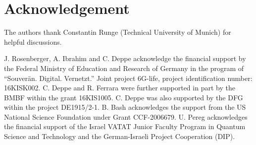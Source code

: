\documentclass[conference,final]{IEEEtran}
\begin{document}
\ifblind\else
\section*{Acknowledgement}

The authors thank Constantin Runge (Technical University of Munich)
for helpful discussions.








J. Rosenberger, A. Ibrahim and C. Deppe
acknowledge the financial support by the Federal Ministry of
Education and Research of Germany in the program of “Souverän. Digital.
Vernetzt.” Joint project 6G-life, project identification number: 16KISK002. C. Deppe and R. Ferrara were further supported in part by the
BMBF within the grant 16KIS1005. C. Deppe was also supported by the DFG
within the project DE1915/2-1.
B. Bash acknowledges the support from the US National Science Foundation under Grant CCF-2006679.
U. Pereg acknowledges the financial support of the Israel VATAT Junior Faculty
Program in Quantum Science and Technology and the German-Israeli Project
Cooperation (DIP).

\fi

\printbibliography
\end{document}
